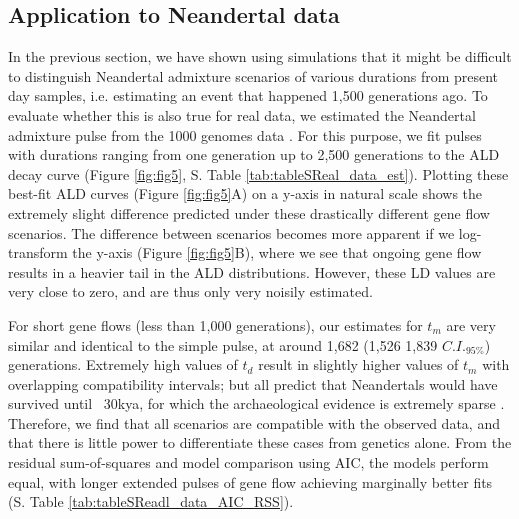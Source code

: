 \documentclass[11pt]{article}
\begin{document}
\subsection{Application to Neandertal data}

In the previous section, we have shown using simulations that it might be difficult to distinguish Neandertal admixture scenarios of various durations from present day samples, i.e. estimating an event that happened 1,500 generations ago. To evaluate whether this is also true for real data, we estimated the Neandertal admixture pulse from the 1000 genomes data \cite{the_1000_genomes_project_consortium_global_2015}. For this purpose,  we fit  pulses with durations ranging from one generation up to 2,500 generations to the ALD decay curve (Figure \ref{fig:fig5}, S. Table \ref{tab:tableSReal_data_est}). Plotting these best-fit ALD curves (Figure \ref{fig:fig5}A) on a y-axis in natural scale shows the extremely slight difference predicted under these drastically different gene flow scenarios. The difference between scenarios becomes more apparent if we log-transform the y-axis (Figure \ref{fig:fig5}B), where we see that ongoing gene flow results in a heavier tail in the ALD distributions. However, these LD values are very close to zero, and are thus only very noisily estimated. 

For short gene flows (less than 1,000 generations), our estimates for $t_m$ are very similar and identical to the simple pulse, at around 1,682 (1,526 1,839 $C.I._{95\%}$) generations. Extremely high values of $t_d$ result in slightly higher values of $t_m$ with overlapping compatibility intervals; but all predict that Neandertals would have survived until ~30kya, for which the archaeological evidence is extremely sparse \cite{hublin_last_2017}.  Therefore, we find that all scenarios are compatible with the observed data, and that there is little power to differentiate these cases from genetics alone. From the residual sum-of-squares and model comparison using AIC, the models perform equal, with longer extended pulses of gene flow achieving marginally better fits (S. Table \ref{tab:tableSReadl_data_AIC_RSS}). 
\end{document}
